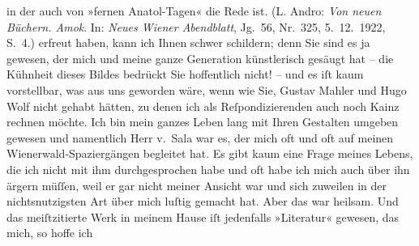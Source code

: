 \begin{ledgroupsized}[t]{13cm}
{{{                  in der auch von »fernen Anatol-Tagen« die Rede ist. (L. Andro: \emph{Von neuen Büchern. Amok}. In: \emph{Neues Wiener Abendblatt}, Jg. 56, Nr. 325, 5. 12. 1922,
                     S. 4.)}}}\label{K_L02572-2h} erfreut haben, kann ich Ihnen schwer schildern; denn Sie
               sind es ja gewesen, der mich und meine ganze Generation künstlerisch gesäugt hat –
               die Kühnheit dieses Bildes bedrückt Sie hoffentlich nicht! – und es iſt kaum
               vorstellbar, was aus uns geworden wäre, wenn wie Sie, Gustav Mahler und Hugo Wolf nicht gehabt
               hätten, zu denen ich als Reſpondizierenden auch noch Kainz rechnen möchte. Ich bin mein ganzes Leben lang \strikeout{\textcolor{gray}{viel}} mit Ihren Gestalten umgeben gewesen und namentlich Herr v. Sala war es, der mich oft und oft auf
               meinen Wienerwald-Spaziergängen begleitet hat. Es
               gibt kaum eine Frage meines Lebens, die ich nicht mit ihm durchgesprochen habe und
               oft habe ich mich auch über ihn ärgern müſſen, weil er gar nicht meiner Ansicht war
               und sich zuweilen in der nichtsnutzigsten Art über mich luſtig gemacht hat. Aber das
               war heilsam. Und das meiſtzitierte Werk in meinem Hause iſt jedenfalls »Literatur« gewesen, das mich, so hoffe ich

\end{ledgroupsized}

